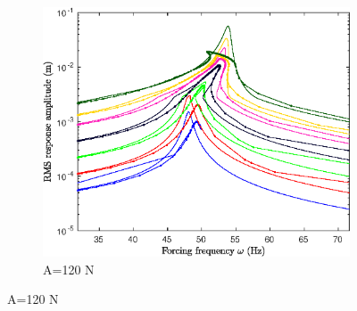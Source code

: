\documentclass[aspectratio=169]{beamer}
\begin{document}
\begin{frame}
\begin{figure}
\begin{subfigure}{0.25\linewidth}
      \includegraphics[width=\linewidth]{../../benchmark5/FIGURES/pnlssfrf_Amp_b5_A120_up4_ms_full_na2_nx23}
      \caption{A=120 N}
    \end{subfigure}
  \end{figure}
\end{frame}
\end{document}
